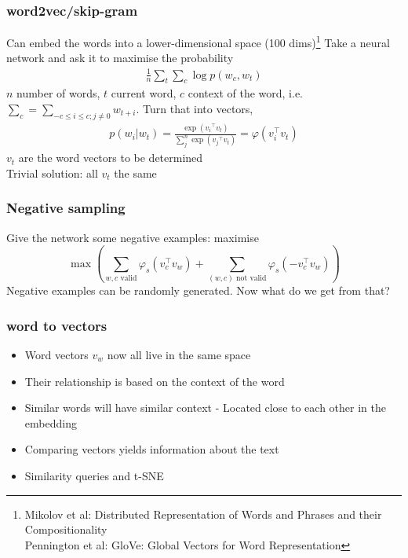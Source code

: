 \documentclass{beamer}
\begin{document}
\begin{frame}
\frametitle{word2vec/skip-gram}
Can embed the words into a lower-dimensional space (100 dims)\footnote{Mikolov et al: Distributed Representation of Words and Phrases and their Compositionality\\
Pennington et al: GloVe: Global Vectors for Word Representation}
Take a neural network and ask it to maximise the probability
\begin{align*}
\frac1n\sum_t \sum_c \log p(w_c, w_t)
\end{align*}
$n$ number of words, $t$ current word, $c$ context of the word, i.e. $\sum_c = \sum_{-c\le i \le c; j\ne 0} w_{t+i}$. Turn that into vectors,
\begin{align*}
p(w_i | w_t) = \frac{\exp\left({v_i}^\intercal v_t\right)}{\sum_j^n \exp \left({v_j}^\intercal v_t\right)} = \varphi(v_i^\intercal v_t)
\end{align*}
$v_t$ are the word vectors to be determined\\
Trivial solution: all $v_t$ the same
\end{frame}

\begin{frame}
\frametitle{Negative sampling}
Give the network some negative examples: maximise
\begin{equation*}
\max \left(\sum_{w,c \text{ valid}} \varphi_s \left(v_c^\intercal v_w\right) + \sum_{(w, c) \text{ not valid}} \varphi_s \left(-v_c^\intercal v_w\right)\right)
\end{equation*}
Negative examples can be randomly generated. Now what do we get from that?
\end{frame}

\begin{frame}
\frametitle{word to vectors}
\begin{itemize}
\item Word vectors $v_w$ now all live in the same space
\item Their relationship is based on the context of the word
\item Similar words will have similar context - Located close to each other in the embedding
\item Comparing vectors yields information about the text
\item Similarity queries and t-SNE
\end{itemize}
\end{frame}
\end{document}

